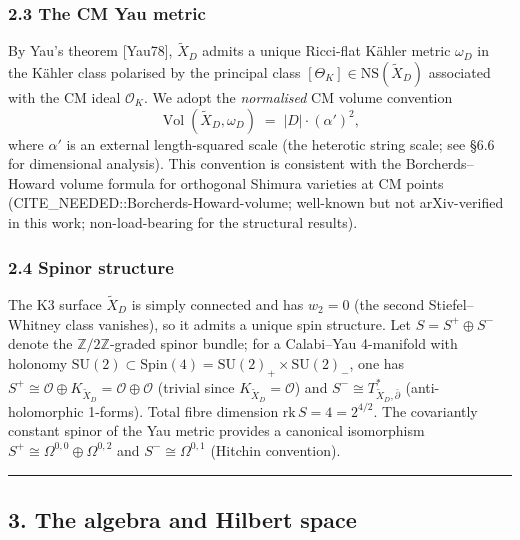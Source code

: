\documentclass[
  11pt,
  a4paper,
]{amsart}
\begin{document}
\hypertarget{the-cm-yau-metric}{%
\subsubsection{2.3 The CM Yau metric}\label{the-cm-yau-metric}}

By Yau's theorem {[}Yau78{]}, \(\widetilde{X}_D\) admits a unique Ricci-flat Kähler
metric \(\omega_D\) in the Kähler class polarised by the principal class
\([\Theta_K] \in \mathrm{NS}(\widetilde{X}_D)\) associated with the CM ideal
\(\mathcal{O}_K\). We adopt the \emph{normalised} CM volume convention
\begin{equation}\label{eq:vol-norm}
\operatorname{Vol}(\widetilde{X}_D, \omega_D) \;=\; |D| \cdot (\alpha')^2,
\end{equation}
where \(\alpha'\) is an external length-squared scale (the heterotic string
scale; see §6.6 for dimensional analysis). This convention is consistent with
the Borcherds--Howard volume formula for orthogonal Shimura varieties at CM
points (CITE\_NEEDED::Borcherds-Howard-volume; well-known but not
arXiv-verified in this work; non-load-bearing for the structural results).

\hypertarget{spinor-structure}{%
\subsubsection{2.4 Spinor structure}\label{spinor-structure}}

The K3 surface \(\widetilde{X}_D\) is simply connected and has \(w_2 = 0\)
(the second Stiefel--Whitney class vanishes), so it admits a unique spin
structure. Let \(S = S^+ \oplus S^-\) denote the \(\mathbb{Z}/2\mathbb{Z}\)-graded
spinor bundle; for a Calabi--Yau 4-manifold with holonomy
\(\mathrm{SU}(2) \subset \mathrm{Spin}(4) = \mathrm{SU}(2)_+ \times \mathrm{SU}(2)_-\),
one has \(S^+ \cong \mathcal{O} \oplus K_{\widetilde{X}_D} = \mathcal{O} \oplus \mathcal{O}\)
(trivial since \(K_{\widetilde{X}_D} = \mathcal{O}\)) and
\(S^- \cong T^*_{\widetilde{X}_D, \bar\partial}\) (anti-holomorphic 1-forms).
Total fibre dimension \(\mathrm{rk}\, S = 4 = 2^{4/2}\). The covariantly constant
spinor of the Yau metric provides a canonical isomorphism
\(S^+ \cong \Omega^{0,0} \oplus \Omega^{0,2}\) and \(S^- \cong \Omega^{0,1}\)
(Hitchin convention).

\begin{center}\rule{0.5\linewidth}{0.5pt}\end{center}

\hypertarget{the-algebra-and-hilbert-space}{%
\subsection{3. The algebra and Hilbert space}\label{the-algebra-and-hilbert-space}}
\end{document}
